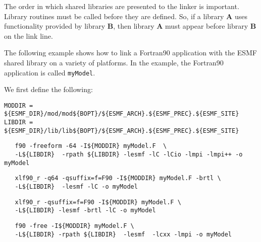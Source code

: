 The order in which shared libraries are presented to 
the linker is important. Library routines must be called before they are 
defined. So, if a library {\bf A} uses functionality provided by library 
{\bf B}, then library {\bf A} must appear before library {\bf B} on the link line. 

The following example shows how to link a Fortran90 
application with the ESMF shared library on a variety of platforms.  
In the example, the Fortran90 application is called {\tt myModel}.

\noindent We first define the following:

\begin{verbatim}
MODDIR = ${ESMF_DIR}/mod/mod${BOPT}/${ESMF_ARCH}.${ESMF_PREC}.${ESMF_SITE}
LIBDIR = ${ESMF_DIR}/lib/lib${BOPT}/${ESMF_ARCH}.${ESMF_PREC}.${ESMF_SITE}
\end{verbatim}


\begin{verbatim}
   f90 -freeform -64 -I${MODDIR} myModel.F  \
   -L${LIBDIR}  -rpath ${LIBDIR} -lesmf -lC -lCio -lmpi -lmpi++ -o myModel  
\end{verbatim}


\begin{verbatim}
   xlf90_r -q64 -qsuffix=f=F90 -I${MODDIR} myModel.F -brtl \
   -L${LIBDIR}  -lesmf -lC -o myModel
\end{verbatim}


\begin{verbatim}
   xlf90_r -qsuffix=f=F90 -I${MODDIR} myModel.F \
   -L${LIBDIR} -lesmf -brtl -lC -o myModel
\end{verbatim}


\begin{verbatim}
   f90 -free -I${MODDIR} myModel.F \
   -L${LIBDIR} -rpath ${LIBDIR}  -lesmf  -lcxx -lmpi -o myModel
\end{verbatim}








